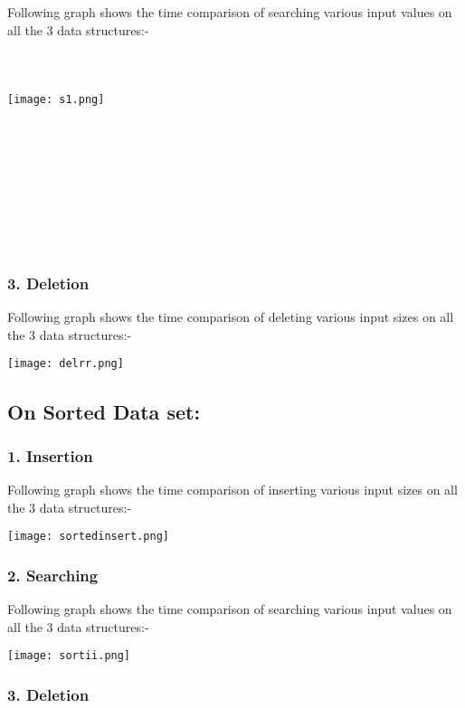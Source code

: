 Following graph shows the time comparison of searching various input values on all the 3 data structures:-\\ \\ \\ \\ 


\texttt{[image: s1.png]}  \\ 


\subsubsection*{\\ \\ \\ \\ \\ \\ \\ 3. Deletion}

Following graph shows the time comparison of deleting various input sizes on all the 3 data structures:-


\texttt{[image: delrr.png]} 



\subsection*{On Sorted Data set:}

\subsubsection*{1. Insertion}

Following graph shows the time comparison of inserting various input sizes on all the 3 data structures:-
 

\texttt{[image: sortedinsert.png]}  

\subsubsection*{2. Searching}

Following graph shows the time comparison of searching various input values on all the 3 data structures:-


\texttt{[image: sortii.png]}  

\subsubsection*{3. Deletion}

